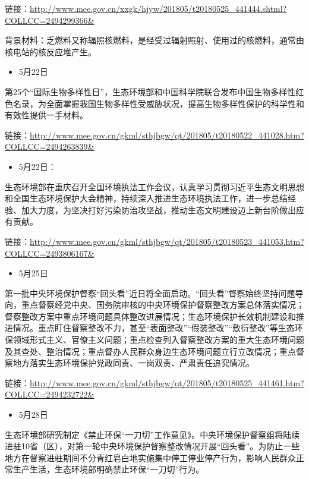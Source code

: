\documentclass[]{book}
\providecommand{\tightlist}{%
  \setlength{\itemsep}{0pt}\setlength{\parskip}{0pt}}
\begin{document}
链接：\url{http://www.mee.gov.cn/xxgk/hjyw/201805/t20180525_441444.shtml?COLLCC=2494299366\&}

背景材料：乏燃料又称辐照核燃料，是经受过辐射照射、使用过的核燃料，通常由核电站的核反应堆产生。

\begin{itemize}
\tightlist
\item
  5月22日
\end{itemize}

第25个``国际生物多样性日''，生态环境部和中国科学院联合发布中国生物多样性红色名录，为全面掌握我国生物多样性受威胁状况，提高生物多样性保护的科学性和有效性提供一手材料。

链接：\url{http://www.mee.gov.cn/gkml/sthjbgw/qt/201805/t20180522_441028.htm?COLLCC=2494263839\&}

\begin{itemize}
\tightlist
\item
  5月22日：
\end{itemize}

生态环境部在重庆召开全国环境执法工作会议，认真学习贯彻习近平生态文明思想和全国生态环境保护大会精神，持续深入推进生态环境执法工作，进一步总结经验、加大力度，为坚决打好污染防治攻坚战，推动生态文明建设迈上新台阶做出应有贡献。

链接：\url{http://www.mee.gov.cn/gkml/sthjbgw/qt/201805/t20180523_441053.htm?COLLCC=2493806167\&}

\begin{itemize}
\tightlist
\item
  5月25日
\end{itemize}

第一批中央环境保护督察``回头看''近日将全面启动。``回头看''督察始终坚持问题导向，重点督察经党中央、国务院审核的中央环境保护督察整改方案总体落实情况；督察整改方案中重点环境问题具体整改进展情况；生态环境保护长效机制建设和推进情况。重点盯住督察整改不力，甚至``表面整改''``假装整改''``敷衍整改''等生态环保领域形式主义、官僚主义问题；重点检查列入督察整改方案的重大生态环境问题及其查处、整治情况；重点督办人民群众身边生态环境问题立行立改情况；重点督察地方落实生态环境保护党政同责、一岗双责、严肃责任追究情况。

链接：\url{http://www.mee.gov.cn/gkml/sthjbgw/qt/201805/t20180525_441461.htm?COLLCC=2494232722\&}

\begin{itemize}
\tightlist
\item
  5月28日
\end{itemize}

生态环境部研究制定《禁止环保``一刀切''工作意见》。中央环境保护督察组将陆续进驻10省（区），对第一轮中央环境保护督察整改情况开展``回头看''。为防止一些地方在督察进驻期间不分青红皂白地实施集中停工停业停产行为，影响人民群众正常生产生活，生态环境部明确禁止环保``一刀切''行为。
\end{document}
